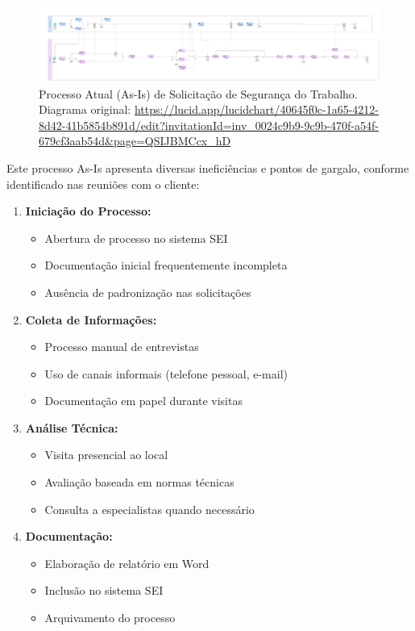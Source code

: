 \documentclass[12pt,a4paper]{article}
\begin{document}
\begin{landscape}
\begin{figure}[p]
\centering
\includegraphics[width=0.85\paperwidth, height=0.8\paperheight, keepaspectratio]{images/AS-IS.jpg}
\caption{Processo Atual (As-Is) de Solicitação de Segurança do Trabalho. \\ Diagrama original: \url{https://lucid.app/lucidchart/40645f0c-1a65-4212-8d42-41b5854b891d/edit?invitationId=inv_0024c9b9-9c9b-470f-a54f-679cf3aab54d&page=QSIJBMCcx_hD}}
\end{figure}
\end{landscape}


Este processo As-Is apresenta diversas ineficiências e pontos de gargalo, conforme identificado nas reuniões com o cliente:

\begin{enumerate}
    \item \textbf{Iniciação do Processo:}
    \begin{itemize}
        \item Abertura de processo no sistema SEI
        \item Documentação inicial frequentemente incompleta
        \item Ausência de padronização nas solicitações
    \end{itemize}
    
    \item \textbf{Coleta de Informações:}
    \begin{itemize}
        \item Processo manual de entrevistas
        \item Uso de canais informais (telefone pessoal, e-mail)
        \item Documentação em papel durante visitas
    \end{itemize}
    
    \item \textbf{Análise Técnica:}
    \begin{itemize}
        \item Visita presencial ao local
        \item Avaliação baseada em normas técnicas
        \item Consulta a especialistas quando necessário
    \end{itemize}
    
    \item \textbf{Documentação:}
    \begin{itemize}
        \item Elaboração de relatório em Word
        \item Inclusão no sistema SEI
        \item Arquivamento do processo
    \end{itemize}
\end{enumerate}
\end{document}
